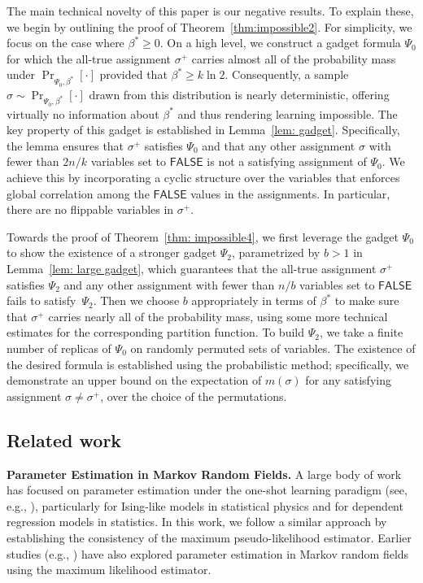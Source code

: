 \documentclass[11pt]{article}
\theoremstyle{definition}
\theoremstyle{remark}
\def\FALSE{\mathsf{FALSE}}
\begin{document}
The main technical novelty of this paper is our negative results. To explain these,  we begin by outlining the proof of Theorem~\ref{thm:impossible2}. For simplicity, we focus on the case where  $\beta^*\ge 0$. On a high level, we construct a gadget formula $\Psi_0$ for which the all-true assignment $\sigma^+$ carries almost all of the probability mass under $ \Pr_{\Psi_0,\beta^*}[\cdot]$ provided that $\beta^*\ge k \ln 2$. Consequently, a sample $\sigma\sim \Pr_{\Psi_0,\beta^*}[\cdot]$ drawn from this distribution is nearly deterministic, offering virtually no information about $\beta^*$
  and thus rendering learning impossible.
The key property of this gadget is established in Lemma~\ref{lem: gadget}. 
Specifically, the lemma ensures that $\sigma^+$ satisfies $\Psi_0$ and that any other assignment $\sigma$ with 
fewer than $2n/k$ variables set to $\FALSE$ is not a satisfying assignment of $\Psi_0$. 
We achieve this by incorporating a cyclic structure over the variables that enforces global correlation among the $\FALSE$ values in the assignments. In particular, there are no flippable variables in $\sigma^+$.

Towards the proof of Theorem~\ref{thm: impossible4},
we first leverage the gadget $\Psi_0$ to show the existence of a stronger gadget $\Psi_2$, parametrized by $b>1$ in Lemma~\ref{lem: large gadget}, which guarantees that the all-true assignment $\sigma^+$ satisfies $\Psi_2$ and any other assignment 
with fewer than $n/b$ variables set to $\FALSE$  fails to satisfy~$\Psi_2$. 
Then we choose $b$ appropriately in terms of $\beta^*$ to make sure that $\sigma^+$ carries nearly all of the probability mass, using some more technical estimates for the corresponding partition function.
To build $\Psi_2$, we take a finite number of replicas of $\Psi_0$ on randomly permuted sets of variables. The existence of the desired formula is established using the probabilistic method; specifically, we demonstrate an upper bound on the expectation of $m(\sigma)$ for any satisfying assignment $\sigma\neq \sigma^+$, over the choice of the permutations.

\subsection{Related work}
\noindent \textbf{Parameter Estimation in Markov Random Fields.}  A large body of work has focused on parameter estimation under the one-shot learning paradigm (see, e.g., \cite{Chatterjee07c, BM18, DDK19, DDP20, GM20, DDDVK21, MSB}), particularly for Ising-like models in statistical physics and for dependent regression models in statistics. In this work, we follow a similar approach by establishing the consistency of the maximum pseudo-likelihood estimator.  Earlier studies (e.g., \cite{Gidas88, CometsGidas91, Comets92, GeyerThompson92}) have also explored parameter estimation in Markov random fields using the maximum likelihood estimator.
\end{document}
